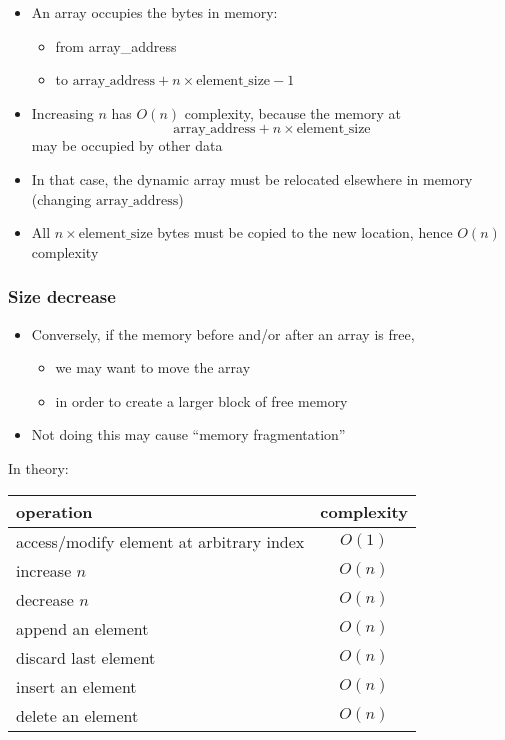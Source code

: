 \documentclass[12pt]{article}
\begin{document}
\begin{itemize}
  \item An array occupies the bytes in memory:
  \begin{itemize}
    \item from array\_address
    \item to \( \text{array\_address} + n \times \text{element\_size} - 1 \)
  \end{itemize}
  \item Increasing \( n \) has \( O(n) \) complexity, because the memory at
  \[ \text{array\_address} + n \times \text{element\_size} \]
  may be occupied by other data
  \item In that case, the dynamic array must be relocated elsewhere in memory (changing \( \text{array\_address} \))
  \item All \( n \times \text{element\_size} \) bytes must be copied to the new location, hence \( O(n) \) complexity
\end{itemize}




\subsubsection{Size decrease}

\begin{itemize}
    \item Conversely, if the memory before and/or after an array is free,
    \begin{itemize}
        \item we may want to move the array
        \item in order to create a larger block of free memory
    \end{itemize}
    \item Not doing this may cause ``memory fragmentation''
\end{itemize}

\noindent In theory:

\begin{center}
\begin{tabular}{l c}
\hline
operation & complexity \\
\hline
access/modify element at arbitrary index & $O(1)$ \\
increase $n$ & $O(n)$ \\
decrease $n$ & $O(n)$ \\
append an element & $O(n)$ \\
discard last element & $O(n)$ \\
insert an element & $O(n)$ \\
delete an element & $O(n)$ \\
\hline
\end{tabular}
\end{center}
\end{document}
